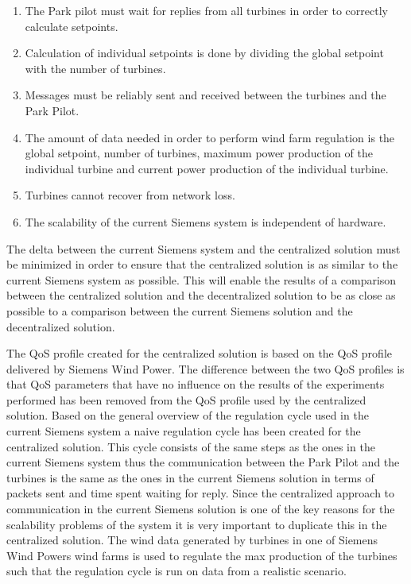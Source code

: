 \begin{enumerate}
	\item The Park pilot must wait for replies from all turbines in order to correctly calculate setpoints.
	\item Calculation of individual setpoints is done by dividing the global setpoint with the number of turbines.
	\item Messages must be reliably sent and received between the turbines and the Park Pilot.
	\item The amount of data needed in order to perform wind farm regulation is the global setpoint, number of turbines, maximum power production of the individual turbine and current power production of the individual turbine.
	\item Turbines cannot recover from network loss.
	\item The scalability of the current Siemens system is independent of hardware.  
\end{enumerate}

The delta between the current Siemens system and the centralized solution must be minimized in order to ensure that the centralized solution is as similar to the current Siemens system as possible. This will enable the results of a comparison between the centralized solution and the decentralized solution to be as close as possible to a comparison between the current Siemens solution and the decentralized solution.

The QoS profile created for the centralized solution is based on the QoS profile delivered by Siemens Wind Power. The difference between the two QoS profiles is that QoS parameters that have no influence on the results of the experiments performed has been removed from the QoS profile used by the centralized solution.
Based on the general overview of the regulation cycle used in the current Siemens system a naive regulation cycle has been created for the centralized solution. This cycle consists of the same steps as the ones in the current Siemens system thus the communication between the Park Pilot and the turbines is the same as the ones in the current Siemens solution in terms of packets sent and time spent waiting for reply. Since the centralized approach to communication in the current Siemens solution is one of the key reasons for the scalability problems of the system it is very important to duplicate this in the centralized solution.
The wind data generated by turbines in one of Siemens Wind Powers wind farms is used to regulate the max production of the turbines such that the regulation cycle is run on data from a realistic scenario.

